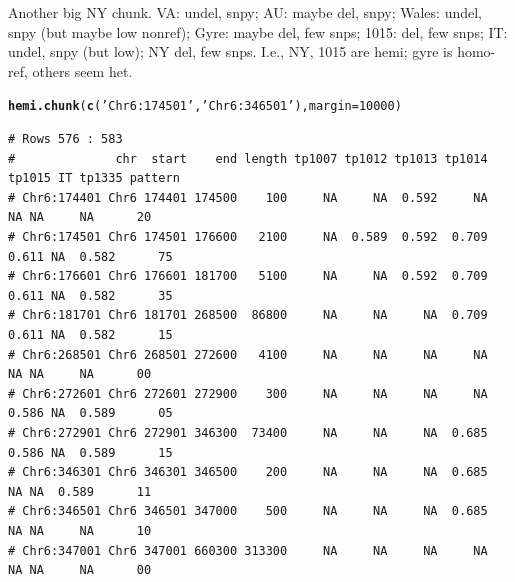 \documentclass{article}\usepackage[]{graphicx}\usepackage[]{color}
\makeatletter
\newcommand{\hlnum}[1]{\textcolor[rgb]{0.686,0.059,0.569}{#1}}%
\newcommand{\hlstr}[1]{\textcolor[rgb]{0.192,0.494,0.8}{#1}}%
\newcommand{\hlstd}[1]{\textcolor[rgb]{0.345,0.345,0.345}{#1}}%
\newcommand{\hlkwc}[1]{\textcolor[rgb]{0.333,0.667,0.333}{#1}}%
\newcommand{\hlkwd}[1]{\textcolor[rgb]{0.737,0.353,0.396}{\textbf{#1}}}%
\newenvironment{kframe}{%
 \def\at@end@of@kframe{}%
 \ifinner\ifhmode%
  \def\at@end@of@kframe{\end{minipage}}%
  \begin{minipage}{\columnwidth}%
 \fi\fi%
 \def\FrameCommand##1{\hskip\@totalleftmargin \hskip-\fboxsep
 \colorbox{shadecolor}{##1}\hskip-\fboxsep
     \hskip-\linewidth \hskip-\@totalleftmargin \hskip\columnwidth}%
 \MakeFramed {\advance\hsize-\width
   \@totalleftmargin\z@ \linewidth\hsize
   \@setminipage}}%
 {\par\unskip\endMakeFramed%
 \at@end@of@kframe}
\newenvironment{knitrout}{}{} %
\makeatother
\begin{document}
Another big NY chunk.  VA: undel, snpy; AU: maybe del, snpy; Wales: undel, snpy (but maybe low nonref);
 Gyre: maybe del, few snps; 1015: del, few snps; IT: undel, snpy (but low); NY del, few snps.
 I.e., NY, 1015 are hemi; gyre is homo-ref, others seem het.
\begin{knitrout}\footnotesize
{}\color{fgcolor}\begin{kframe}
\begin{alltt}
\hlkwd{hemi.chunk}\hlstd{(}\hlkwd{c}\hlstd{(}\hlstr{'Chr6:174501'}\hlstd{,}\hlstr{'Chr6:346501'}\hlstd{),} \hlkwc{margin}\hlstd{=}\hlnum{10000}\hlstd{)}
\end{alltt}
\begin{verbatim}
# Rows 576 : 583 
#              chr  start    end length tp1007 tp1012 tp1013 tp1014 tp1015 IT tp1335 pattern
# Chr6:174401 Chr6 174401 174500    100     NA     NA  0.592     NA     NA NA     NA      20
# Chr6:174501 Chr6 174501 176600   2100     NA  0.589  0.592  0.709  0.611 NA  0.582      75
# Chr6:176601 Chr6 176601 181700   5100     NA     NA  0.592  0.709  0.611 NA  0.582      35
# Chr6:181701 Chr6 181701 268500  86800     NA     NA     NA  0.709  0.611 NA  0.582      15
# Chr6:268501 Chr6 268501 272600   4100     NA     NA     NA     NA     NA NA     NA      00
# Chr6:272601 Chr6 272601 272900    300     NA     NA     NA     NA  0.586 NA  0.589      05
# Chr6:272901 Chr6 272901 346300  73400     NA     NA     NA  0.685  0.586 NA  0.589      15
# Chr6:346301 Chr6 346301 346500    200     NA     NA     NA  0.685     NA NA  0.589      11
# Chr6:346501 Chr6 346501 347000    500     NA     NA     NA  0.685     NA NA     NA      10
# Chr6:347001 Chr6 347001 660300 313300     NA     NA     NA     NA     NA NA     NA      00
\end{verbatim}
\end{kframe}


\end{knitrout}
\end{document}
